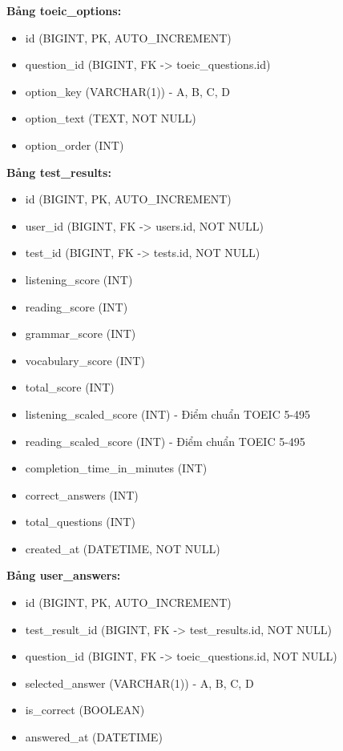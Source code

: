 \documentclass[../DoAn.tex]{subfiles}
\begin{document}
\textbf{Bảng toeic\_options:}
\begin{itemize}
    \item id (BIGINT, PK, AUTO\_INCREMENT)
    \item question\_id (BIGINT, FK -> toeic\_questions.id)
    \item option\_key (VARCHAR(1)) - A, B, C, D
    \item option\_text (TEXT, NOT NULL)
    \item option\_order (INT)
\end{itemize}

\textbf{Bảng test\_results:}
\begin{itemize}
    \item id (BIGINT, PK, AUTO\_INCREMENT)
    \item user\_id (BIGINT, FK -> users.id, NOT NULL)
    \item test\_id (BIGINT, FK -> tests.id, NOT NULL)
    \item listening\_score (INT)
    \item reading\_score (INT)
    \item grammar\_score (INT)
    \item vocabulary\_score (INT)
    \item total\_score (INT)
    \item listening\_scaled\_score (INT) - Điểm chuẩn TOEIC 5-495
    \item reading\_scaled\_score (INT) - Điểm chuẩn TOEIC 5-495
    \item completion\_time\_in\_minutes (INT)
    \item correct\_answers (INT)
    \item total\_questions (INT)
    \item created\_at (DATETIME, NOT NULL)
\end{itemize}

\textbf{Bảng user\_answers:}
\begin{itemize}
    \item id (BIGINT, PK, AUTO\_INCREMENT)
    \item test\_result\_id (BIGINT, FK -> test\_results.id, NOT NULL)
    \item question\_id (BIGINT, FK -> toeic\_questions.id, NOT NULL)
    \item selected\_answer (VARCHAR(1)) - A, B, C, D
    \item is\_correct (BOOLEAN)
    \item answered\_at (DATETIME)
\end{itemize}
\end{document}
